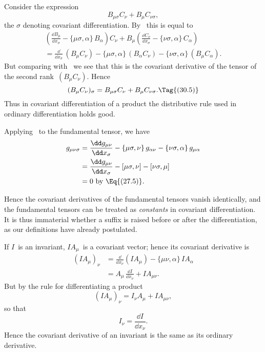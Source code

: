\documentclass[12pt]{book}
\begin{document}
Consider the expression
\[
B_{\mu\sigma} C_{\nu} + B_{\mu} C_{\nu\sigma},
\]
the $\sigma$ denoting covariant differentiation. By~ this is equal to
\begin{multline*}
\left(\frac{\dd B_{\mu}}{\dd x_{\sigma}} - \{\mu\sigma, \alpha\}\, B_{\alpha}\right) C_{\nu}
+ B_{\mu} \left(\frac{\dd C_{\nu}}{\dd x_{\sigma}} - \{\nu\sigma, \alpha\}\, C_{\alpha}\right) \\
= \frac{\dd}{\dd x_{\sigma}}\, (B_{\mu} C_{\nu})
  - \{\mu\sigma, \alpha\}\, (B_{\alpha} C_{\nu})
  - \{\nu\sigma, \alpha\}\, (B_{\mu} C_{\alpha}).
\end{multline*}
But comparing with~ we see that this is the covariant derivative of the
%
%
tensor of the second rank~$(B_{\mu}C_{\nu})$. Hence
\[
(B_{\mu} C_{\nu})_{\sigma} = B_{\mu\sigma} C_{\nu} + B_{\mu} C_{\nu\sigma}.
\Tag{(30.5)}
\]
Thus in covariant differentiation of a product the distributive rule used in
ordinary differentiation holds good.

Applying~ to the fundamental tensor, we have
\begin{align*}
  g_{\mu\nu\sigma}
  &= \frac{\dd g_{\mu\nu}}{\dd x_{\sigma}} - \{\mu\sigma, \nu\}\, g_{\alpha\nu} - \{\nu\sigma, \alpha\}\, g_{\mu\alpha} \\
  &= \frac{\dd g_{\mu\nu}}{\dd x_{\sigma}} - [\mu\sigma, \nu] - [\nu\sigma, \mu] \\
  &= 0 \text{ by \Eq{(27.5)}.}
\end{align*}

Hence the covariant derivatives of the fundamental tensors vanish identically,
and the fundamental tensors can be treated as \emph{constants} in covariant
differentiation. It is thus immaterial whether a suffix is raised before or after
the differentiation, as our definitions have already postulated.

If $I$~is an invariant, $IA_{\mu}$~is a covariant vector; hence its covariant
derivative is
\begin{align*}
  (IA_{\mu})_{\nu} &= \frac{\dd}{\dd x_{\nu}}(IA_{\mu}) - \{\mu\nu, \alpha\}\, IA_{\alpha} \\
  &= A_{\mu}\, \frac{\dd I}{\dd x_{\nu}} + IA_{\mu\nu}.
\end{align*}
But by the rule for differentiating a product~
\[
(IA_{\mu})_{\nu} = I_{\nu} A_{\mu} + IA_{\mu\nu},
\]
so that
\[
I_{\nu} = \frac{\dd I}{\dd x_{\nu}}.
\]
Hence the covariant derivative of an invariant is the same as its ordinary
derivative.
\end{document}
